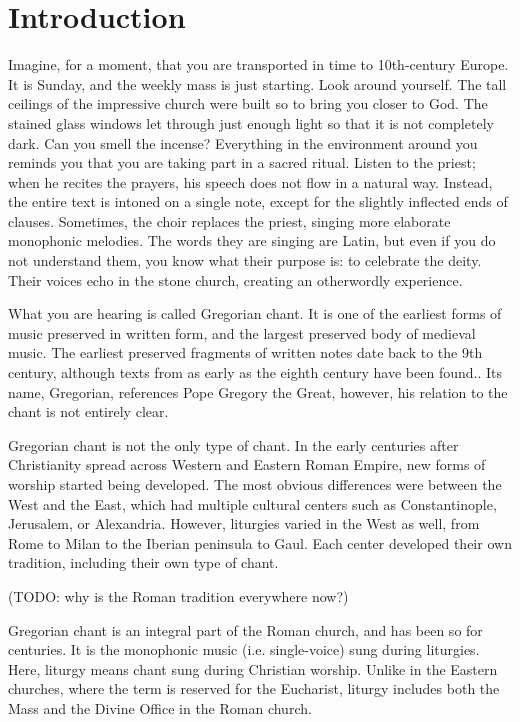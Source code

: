 \chapter*{Introduction}

Imagine, for a moment, that you are transported in time to 10th-century Europe. It is Sunday, and the weekly mass is just
starting. Look around yourself. The tall ceilings of the impressive church were built so to bring you closer to God. The stained glass windows
let through just enough light so that it is not completely dark. Can you smell the incense? Everything in the environment around
you reminds you that you are taking part in a sacred ritual. Listen to the priest; when he recites the prayers, his speech does not 
flow in a natural way. Instead, the entire text is intoned on a single note, except for the slightly inflected ends of clauses. 
Sometimes, the choir replaces the priest, singing more elaborate monophonic melodies. The words they are singing are Latin, but even 
if you do not understand them, you know what their purpose is: to celebrate the deity. Their voices echo in the stone church, creating an
otherwordly experience.

What you are hearing is called Gregorian chant. It is one of the earliest forms of music preserved in written form, and the
largest preserved body of medieval music. The earliest preserved fragments of written notes date back to the 9th century, although texts from as early as 
the eighth century have been found.. Its name, Gregorian, references Pope Gregory the Great, however, his relation to the chant is not entirely clear.

Gregorian chant is not the only type of chant. In the early centuries after Christianity spread across Western and Eastern Roman Empire,
new forms of worship started being developed. The most obvious differences were between the West and the East, which had multiple cultural
centers such as Constantinople, Jerusalem, or Alexandria. However, liturgies varied in the West as well, from Rome to Milan to the Iberian peninsula to Gaul.
Each center developed their own tradition, including their own type of chant. 

(TODO: why is the Roman tradition everywhere now?) %

Gregorian chant is an integral part of the Roman church, and has been so for centuries. It is the monophonic music (i.e. single-voice)
sung during liturgies. Here, liturgy means chant sung during Christian worship. Unlike in the Eastern churches, where the term is reserved 
for the Eucharist, liturgy includes both the Mass and the Divine Office in the Roman church.

